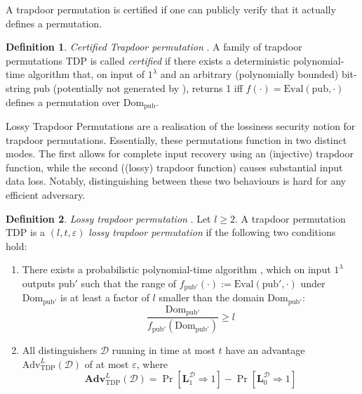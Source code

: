 \documentclass[]{final_report}
\theoremstyle{definition}
\newtheorem{definition}{Definition}[chapter]
\begin{document}
A trapdoor permutation is certified if one can publicly verify that it actually defines a permutation. 

\begin{definition} \textit{Certified Trapdoor permutation} \cite{10.1007/3-540-48071-4_31, bellare1996certifying, 10.1007/978-3-642-34961-4_25}.
\label{def:CTDP}
A family of trapdoor permutations \( \text{TDP} \) is called \textit{certified} if there exists a deterministic polynomial-time algorithm  that, on input of \( 1^{\lambda} \) and an arbitrary (polynomially bounded) bit-string \( \text{pub} \) (potentially not generated by ), returns 1 iff \( f(\cdot) = \text{Eval}(\text{pub}, \cdot) \) defines a permutation over \( \text{Dom}_{\text{pub}} \).
\end{definition}

Lossy Trapdoor Permutations are a realisation of the lossiness security notion for trapdoor permutations. Essentially, these permutations function in two distinct modes. The first allows for complete input recovery using an (injective) trapdoor function, while the second ((lossy) trapdoor function) causes substantial input data loss. Notably, distinguishing between these two behaviours is hard for any efficient adversary.

\begin{definition}
\textit{Lossy trapdoor permutation} \cite{10.1145/1374376.1374406, kakvi2018optimal}. Let \( l \geq 2 \). A trapdoor permutation \( \text{TDP} \) is a \( (l, t, \varepsilon) \) \textit{lossy trapdoor permutation} if the following two conditions hold:

\begin{enumerate}
    \item There exists a probabilistic polynomial-time algorithm , which on input \( 1^\lambda \) outputs \( \text{pub}' \) such that the range of \( f_{\text{pub}'}(\cdot) := \text{Eval}(\text{pub}', \cdot) \) under \( \text{Dom}_{\text{pub}'} \) is at least a factor of \( l \) smaller than the domain \( \text{Dom}_{\text{pub}'} \): 
    \[ \frac{\text{Dom}_{\text{pub}'}}{f_{\text{pub}'}(\text{Dom}_{\text{pub}'})} \geq l \]
    
    \item All distinguishers \( \mathcal{D} \) running in time at most \( t \) have an advantage \( \text{Adv}^L_{\text{TDP}}(\mathcal{D}) \) of at most \( \varepsilon \), where
    \[ \textbf{Adv}^L_{\text{TDP}}(\mathcal{D}) = \Pr[\textbf{L}_{1}^{\mathcal{D}}  \Rightarrow 1] - \Pr[\textbf{L}_{0}^{\mathcal{D}} \Rightarrow 1] \]
\end{enumerate}
\end{definition}
\end{document}
